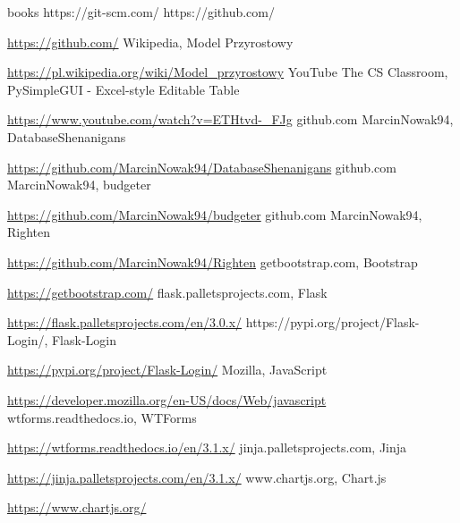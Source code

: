 \documentclass[a4paper,10pt, twoside]{report}
\begin{document}
\begin{large}
\begin{thebibliography} {books}
{        https://git-scm.com/}
     https://github.com/ \raggedright\url{
        https://github.com/}
     Wikipedia, Model Przyrostowy \raggedright\url{
        https://pl.wikipedia.org/wiki/Model_przyrostowy}
     YouTube The CS Classroom, PySimpleGUI - Excel-style Editable Table \raggedright\url{
        https://www.youtube.com/watch?v=ETHtvd-_FJg}
     github.com MarcinNowak94, DatabaseShenanigans \raggedright\url{
        https://github.com/MarcinNowak94/DatabaseShenanigans}
     github.com MarcinNowak94, budgeter \raggedright\url{
        https://github.com/MarcinNowak94/budgeter}
     github.com MarcinNowak94, Righten \raggedright\url{
        https://github.com/MarcinNowak94/Righten}
     getbootstrap.com, Bootstrap \raggedright\url{
        https://getbootstrap.com/}
     flask.palletsprojects.com, Flask \raggedright\url{
        https://flask.palletsprojects.com/en/3.0.x/}
     https://pypi.org/project/Flask-Login/, Flask-Login \raggedright\url{
        https://pypi.org/project/Flask-Login/}
     Mozilla, JavaScript \raggedright\url{
        https://developer.mozilla.org/en-US/docs/Web/javascript}   
     wtforms.readthedocs.io, WTForms \raggedright\url{
        https://wtforms.readthedocs.io/en/3.1.x/}
     jinja.palletsprojects.com, Jinja \raggedright\url{
        https://jinja.palletsprojects.com/en/3.1.x/}
     www.chartjs.org, Chart.js \raggedright\url{
        https://www.chartjs.org/}      
\end{thebibliography}

\listoffigures
\listoftables
\lstlistoflistings

\end{large}
\end{document}
